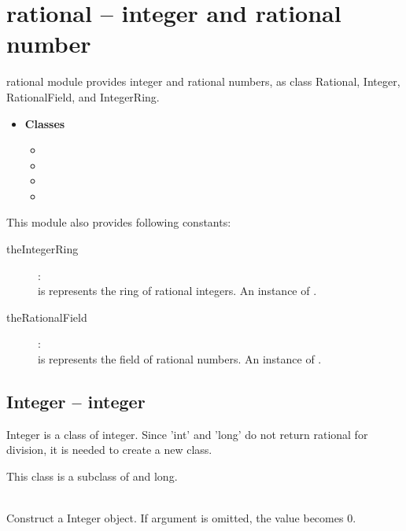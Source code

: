 

 \section{rational -- integer and rational number}
rational module provides integer and rational numbers, as class Rational, Integer, RationalField, and IntegerRing.

 \begin{itemize}
   \item {\bf Classes}
   \begin{itemize}
     \item {}
     \item {}
     \item {}
     \item {}
   \end{itemize}
 \end{itemize}

This module also provides following constants:
\begin{description}
   \item[theIntegerRing]:\\
      is represents the ring of rational integers.
     An instance of .
   \item[theRationalField]:\\
      is represents the field of rational numbers.
     An instance of .
 \end{description}

\C

 \subsection{Integer -- integer}
 Integer is a class of integer. Since 'int' and 'long' do not return rational for division, it is needed to create a new class.

 This class is a subclass of  and long.

  \initialize
  \\
  \spacing
  \quad Construct a Integer object.
  If argument is omitted, the value becomes 0.
  \method
